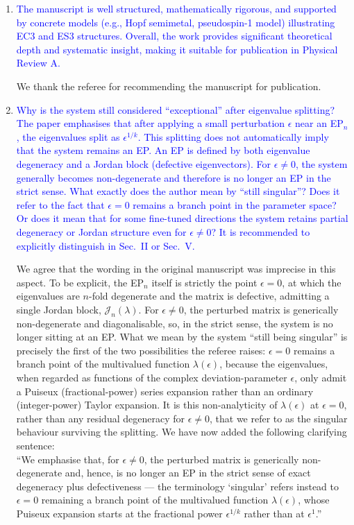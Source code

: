 \documentclass[aps,prb,onecolumn,nofootinbib,citeautoscript,10pt]{revtex4-2}
\begin{document}
\begin{enumerate}

\item \textcolor{blue}{The manuscript is well structured, mathematically rigorous, and supported by concrete models (e.g., Hopf semimetal, pseudospin-1 model) illustrating EC3 and ES3 structures. Overall, the work provides significant theoretical depth and systematic insight, making it suitable for publication in Physical Review A.}

We thank the referee for recommending the manuscript for publication.


\item \textcolor{blue}{Why is the system still considered ``exceptional'' after eigenvalue splitting? The paper emphasises that after applying a small perturbation $\epsilon$ near an EP$_n$, the eigenvalues split as $\epsilon^{1/k}$. This splitting does not automatically imply that the system remains an EP. An EP is defined by both eigenvalue degeneracy and a Jordan block (defective eigenvectors). For $\epsilon \neq 0$, the system generally becomes non-degenerate and therefore is no longer an EP in the strict sense. What exactly does the author mean by ``still singular''? Does it refer to the fact that $\epsilon=0$ remains a branch point in the parameter space? Or does it mean that for some fine-tuned directions the system retains partial degeneracy or Jordan structure even for $\epsilon \neq 0$? It is recommended to explicitly distinguish in Sec.~II or Sec.~V.}

We agree that the wording in the original manuscript was imprecise in this aspect. To be explicit, the EP$_n$ itself is strictly the point $\epsilon=0$, at which the eigenvalues are $n$-fold degenerate and the matrix is defective, admitting a single Jordan block, $\mathcal J_n (\lambda)$. For $\epsilon \neq 0$, the perturbed matrix is generically non-degenerate and diagonalisable, so, in the strict sense, the system is no longer sitting at an EP. What we mean by the system ``still being singular'' is precisely the first of the two possibilities the referee raises: $\epsilon=0$ remains a branch point of the multivalued function $\lambda(\epsilon)$, because the eigenvalues, when regarded as functions of the complex deviation-parameter $\epsilon$, only admit a Puiseux (fractional-power) series expansion rather than an ordinary (integer-power) Taylor expansion. It is this non-analyticity of $\lambda(\epsilon)$ at $\epsilon=0$, rather than any residual degeneracy for $\epsilon \neq 0$, that we refer to as the singular behaviour surviving the splitting. We have now added the following clarifying sentence: 
\\``We emphasise that, for $\epsilon \neq 0$, the perturbed matrix is generically non-degenerate and, hence, is no longer an EP in the strict sense of exact degeneracy plus defectiveness --- the terminology `singular' refers instead to $\epsilon=0$ remaining a branch point of the multivalued function $\lambda(\epsilon)$, whose Puiseux expansion starts at the fractional power $\epsilon^{1/k}$ rather than at $\epsilon^1$.''


\end{enumerate}
\end{document}

